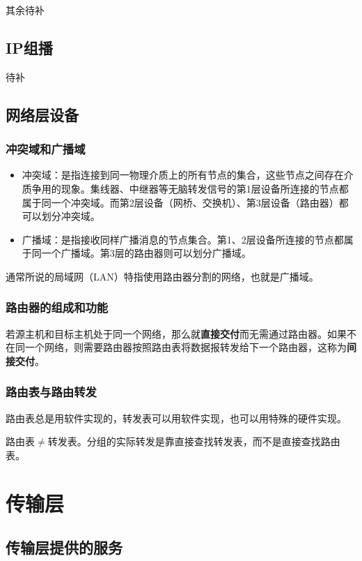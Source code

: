\documentclass[12pt, a4paper, oneside]{ctexart}
\begin{document}
其余待补

\subsection{IP组播}

待补

\subsection{网络层设备}

\subsubsection{冲突域和广播域}

\begin{itemize}
    \item 冲突域：是指连接到同一物理介质上的所有节点的集合，这些节点之间存在介质争用的现象。集线器、中继器等无脑转发信号的第1层设备所连接的节点都属于同一个冲突域。而第2层设备（网桥、交换机）、第3层设备（路由器）都可以划分冲突域。
    \item 广播域：是指接收同样广播消息的节点集合。第1、2层设备所连接的节点都属于同一个广播域。第3层的路由器则可以划分广播域。
\end{itemize}
通常所说的局域网（LAN）特指使用路由器分割的网络，也就是广播域。

\subsubsection{路由器的组成和功能}

若源主机和目标主机处于同一个网络，那么就\textbf{直接交付}而无需通过路由器。如果不在同一个网络，则需要路由器按照路由表将数据报转发给下一个路由器，这称为\textbf{间接交付}。

\subsubsection{路由表与路由转发}

路由表总是用软件实现的，转发表可以用软件实现，也可以用特殊的硬件实现。

路由表$\neq$转发表。分组的实际转发是靠直接查找转发表，而不是直接查找路由表。

\section{传输层}

\subsection{传输层提供的服务}
\end{document}
